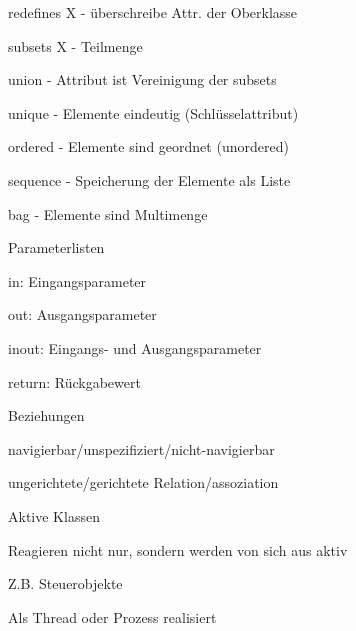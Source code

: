 \documentclass[a4paper]{article}
\begin{document}
\begin{multicols}{3}
\begin{itemize*}
\begin{itemize*}
            \item redefines X - überschreibe Attr. der Oberklasse
            \item subsets X - Teilmenge
            \item union - Attribut ist Vereinigung der subsets
            \item unique - Elemente eindeutig (Schlüsselattribut)
            \item ordered - Elemente sind geordnet (unordered)
            \item sequence - Speicherung der Elemente als Liste
            \item bag - Elemente sind Multimenge
          \end{itemize*}
    \item Parameterlisten
          \begin{itemize*}
            \item in: Eingangsparameter
            \item out: Ausgangsparameter
            \item inout: Eingangs- und Ausgangsparameter
            \item return: Rückgabewert
          \end{itemize*}
    \item Beziehungen
          \begin{itemize*}
            \item navigierbar/unspezifiziert/nicht-navigierbar
            \item ungerichtete/gerichtete Relation/assoziation
          \end{itemize*}
  \end{itemize*}

  Aktive Klassen
  \begin{itemize*}
    \item Reagieren nicht nur, sondern werden von sich aus aktiv
    \item Z.B. Steuerobjekte
    \item Als Thread oder Prozess realisiert
  \end{itemize*}


\end{multicols}
\end{document}
